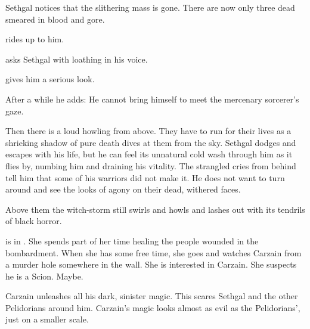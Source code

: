 Sethgal notices that the slithering mass is gone. 
There are now only three dead \nephilim smeared in blood and gore. 

\Shachar rides up to him.

 asks Sethgal with loathing in his voice.

\Shachar gives him a serious look. 



After a while he adds: 
He cannot bring himself to meet the mercenary sorcerer's gaze. 


Then there is a loud howling from above. 
They have to run for their lives as a shrieking shadow of pure death dives at them from the sky. 
Sethgal dodges and escapes with his life, but he can feel its unnatural cold wash through him as it flies by, numbing him and draining his vitality. 
The strangled cries from behind tell him that some of his warriors did not make it. 
He does not want to turn around and see the looks of agony on their dead, withered faces. 

Above them the witch-storm still swirls and howls and lashes out with its tendrils of black horror. 







\begin{comment}
  \subsection{Esmerel}
\end{comment}
\new
\Esmerel is in \Forclin.
She spends part of her time healing the people wounded in the bombardment.
When she has some free time, she goes and watches Carzain from a murder hole somewhere in the wall. 
She is interested in Carzain. 
She suspects he is a Scion. 
Maybe.

Carzain unleashes all his dark, sinister magic.
This scares Sethgal and the other Pelidorians around him.
Carzain's magic looks almost as evil as the Pelidorians', just on a smaller scale. 

